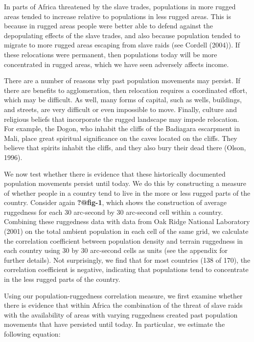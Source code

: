 \documentclass[
  letterpaper,
  DIV=11,
  numbers=noendperiod]{scrartcl}
\begin{document}
In parts of Africa threatened by the slave trades, populations in more
rugged areas tended to increase relative to populations in less rugged
areas. This is because in rugged areas people were better able to defend
against the depopulating effects of the slave trades, and also because
population tended to migrate to more rugged areas escaping from slave
raids (see Cordell (2004)). If these relocations were permanent, then
populations today will be more concentrated in rugged areas, which we
have seen adversely affects income.

There are a number of reasons why past population movements may persist.
If there are benefits to agglomeration, then relocation requires a
coordinated effort, which may be difficult. As well, many forms of
capital, such as wells, buildings, and streets, are very difficult or
even impossible to move. Finally, culture and religious beliefs that
incorporate the rugged landscape may impede relocation. For example, the
Dogon, who inhabit the cliffs of the Badiagara escarpment in Mali, place
great spiritual significance on the caves located on the cliffs. They
believe that spirits inhabit the cliffs, and they also bury their dead
there (Olson, 1996).

We now test whether there is evidence that these historically documented
population movements persist until today. We do this by constructing a
measure of whether people in a country tend to live in the more or less
rugged parts of the country. Consider again \textbf{?@fig-1}, which
shows the construction of average ruggedness for each 30 arc-second by
30 arc-second cell within a country. Combining these ruggedness data
with data from Oak Ridge National Laboratory (2001) on the total ambient
population in each cell of the same grid, we calculate the correlation
coefficient between population density and terrain ruggedness in each
country using 30 by 30 arc-second cells as units (see the appendix for
further details). Not surprisingly, we find that for most countries (138
of 170), the correlation coefficient is negative, indicating that
populations tend to concentrate in the less rugged parts of the country.

Using our population-ruggedness correlation measure, we first examine
whether there is evidence that within Africa the combination of the
threat of slave raids with the availability of areas with varying
ruggedness created past population movements that have persisted until
today. In particular, we estimate the following equation:
\end{document}
